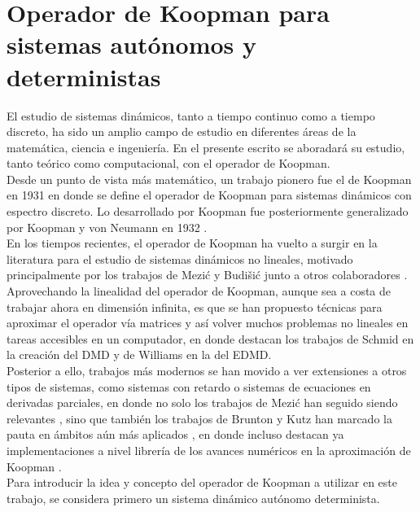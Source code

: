 \section{Operador de Koopman para sistemas autónomos y deterministas}
El estudio de sistemas dinámicos, tanto a tiempo continuo como a tiempo discreto, ha sido un amplio campo de estudio en diferentes áreas de la matemática, ciencia e ingeniería. En el presente escrito se aboradará su estudio, tanto teórico como computacional, con el operador de Koopman. \\ Desde un punto de vista más matemático, un trabajo pionero fue el de Koopman en 1931 \cite{Koopman1931HamiltonianSpace} en donde se define el operador de Koopman para sistemas dinámicos con espectro discreto. Lo desarrollado por Koopman fue posteriormente generalizado por Koopman y von Neumann en 1932 \cite{Koopman1932DynamicalSpectra}.\\
En los tiempos recientes, el operador de Koopman ha vuelto a surgir en la literatura para el estudio de sistemas dinámicos no lineales, motivado principalmente por los trabajos de Mezić y Budišić junto a otros colaboradores \cite{Budisic2009AnObservables, Budisic2012GeometryFlows, Budisic2012AppliedKoopmanism}. \\
Aprovechando la linealidad del operador de Koopman, aunque sea a costa de trabajar ahora en dimensión infinita, es que se han propuesto técnicas para aproximar el operador vía matrices y así volver muchos problemas no lineales en tareas accesibles en un computador, en donde destacan los trabajos de Schmid \cite{Schmid2008DynamicData} en la creación del DMD y de Williams \cite{Williams2015ADecomposition} en la del EDMD.\\
Posterior a ello, trabajos más modernos se han movido a ver extensiones a otros tipos de sistemas, como sistemas con retardo o sistemas de ecuaciones en derivadas parciales, en donde no solo los trabajos de Mezić han seguido siendo relevantes \cite{Mezic2013AnalysisOperator, Mezic2020SpectrumGeometry, Mezic2022OnOperator}, sino que también los trabajos de Brunton y Kutz han marcado la pauta en ámbitos aún más aplicados \cite{Kaiser2021Data-drivenControl, Brunton2016KoopmanControl, Proctor2018GeneralizingControl, Lusch2018DeepDynamics, Kamb2020Time-delayApplications, NathanKutz2018AppliedSystems}, en donde incluso destacan ya implementaciones a nivel librería de los avances numéricos en la aproximación de Koopman \cite{Pan2024PyKoopman:Operator}.\\
Para introducir la idea y concepto del operador de Koopman a utilizar en este trabajo, se considera primero un sistema dinámico autónomo determinista.
